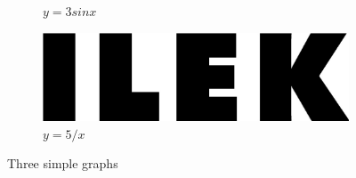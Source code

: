 \begin{figure}
\begin{subfigure}[b]{0.3\textwidth}
		\caption{$y=3sinx$}
		\label{fig:c}
	\end{subfigure}
\hspace{1cm}
	\begin{subfigure}[b]{0.3\textwidth}
		\centering
		\includegraphics[width=\textwidth]{Images/ILEK-logo.jpg}
		\caption{$y=5/x$}
		\label{fig:five over x}
	\end{subfigure}
	\caption{Three simple graphs}
	\label{fig:d}
\end{figure}



